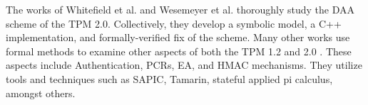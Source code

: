 The works of Whitefield et al. \cite{DAAAnalysis-Whit} and Wesemeyer et al. \cite{DAAAnalysis-Wes} thoroughly study the DAA scheme of the TPM 2.0. Collectively, they develop a symbolic model, a C++ implementation, and formally-verified fix of the scheme. 
Many other works use formal methods to examine other aspects of both the TPM 1.2 \cite{AuthAnalysis,PCRAnalysis} and 2.0 \cite{EAAnalysis,HMACAnalysis}.
These aspects include Authentication, PCRs, EA, and HMAC mechanisms. They utilize tools and techniques such as SAPIC, Tamarin, stateful applied pi calculus, amongst others.




